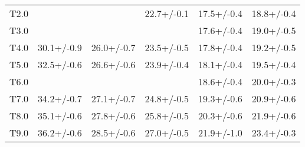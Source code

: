 \begin{tabular}{llllll}
T2.0 &            &            & 22.7+/-0.1 & 17.5+/-0.4 & 18.8+/-0.4 \\
T3.0 &            &            &            & 17.6+/-0.4 & 19.0+/-0.5 \\
T4.0 & 30.1+/-0.9 & 26.0+/-0.7 & 23.5+/-0.5 & 17.8+/-0.4 & 19.2+/-0.5 \\
T5.0 & 32.5+/-0.6 & 26.6+/-0.6 & 23.9+/-0.4 & 18.1+/-0.4 & 19.5+/-0.4 \\
T6.0 &            &            &            & 18.6+/-0.4 & 20.0+/-0.3 \\
T7.0 & 34.2+/-0.7 & 27.1+/-0.7 & 24.8+/-0.5 & 19.3+/-0.6 & 20.9+/-0.6 \\
T8.0 & 35.1+/-0.6 & 27.8+/-0.6 & 25.8+/-0.5 & 20.3+/-0.6 & 21.9+/-0.6 \\
T9.0 & 36.2+/-0.6 & 28.5+/-0.6 & 27.0+/-0.5 & 21.9+/-1.0 & 23.4+/-0.3 \\
\bottomrule
\end{tabular}

